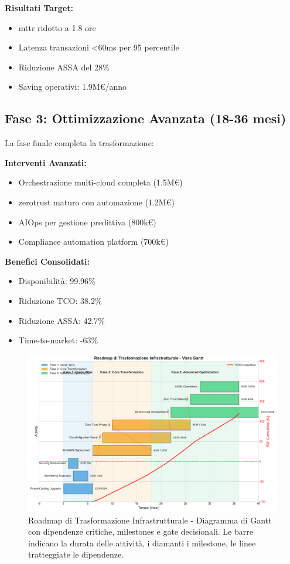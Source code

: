 \textbf{Risultati Target:}
\begin{itemize}
    \item \gls{mttr} ridotto a 1.8 ore
    \item Latenza transazioni <60ms per 95 percentile
    \item Riduzione ASSA del 28\%
    \item Saving operativi: 1.9M€/anno
\end{itemize}

\subsection{\texorpdfstring{Fase 3: Ottimizzazione Avanzata (18-36 mesi)}{3.6.3 - Fase 3: Ottimizzazione Avanzata (18-36 mesi)}}

La fase finale completa la trasformazione:

\textbf{Interventi Avanzati:}
\begin{itemize}
    \item Orchestrazione multi-cloud completa (1.5M€)
    \item \gls{zerotrust} maturo con automazione (1.2M€)
    \item AIOps per gestione predittiva (800k€)
    \item Compliance automation platform (700k€)
\end{itemize}

\textbf{Benefici Consolidati:}
\begin{itemize}
    \item Disponibilità: 99.96\%
    \item Riduzione TCO: 38.2\%
    \item Riduzione ASSA: 42.7\%
    \item Time-to-market: -63\%
\end{itemize}

\begin{figure}[htbp]
\centering
\includegraphics[width=1\textwidth]{thesis_figures/cap3/figura_3_4_roadmap.pdf}
\caption{Roadmap di Trasformazione Infrastrutturale - Diagramma di Gantt con dipendenze critiche, milestones e gate decisionali. Le barre indicano la durata delle attività, i diamanti i milestone, le linee tratteggiate le dipendenze.}
\label{fig:roadmap_transformation}
\end{figure}

